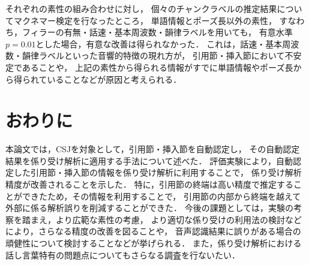 \documentclass[japanese]{jnlp_1.4}
\begin{document}
それぞれの素性の組み合わせに対し，
個々のチャンクラベルの推定結果についてマクネマー検定を行なったところ，
単語情報とポーズ長以外の素性，
すなわち，フィラーの有無・話速・基本周波数・韻律ラベルを用いても，
有意水準$p=0.01$とした場合，有意な改善は得られなかった．
これは，話速・基本周波数・韻律ラベルといった音響的特徴の現れ方が，
引用節・挿入節において不安定であることや，
上記の素性から得られる情報がすでに単語情報やポーズ長から得られていることなどが原因と考えられる．


\section{おわりに}\label{sec:final}

本論文では，CSJを対象として，引用節・挿入節を自動認定し，
その自動認定結果を係り受け解析に適用する手法について述べた．
評価実験により，自動認定した引用節・挿入節の情報を係り受け解析に利用することで，
係り受け解析精度が改善されることを示した．
特に，引用節の終端は高い精度で推定することができたため，その情報を利用することで，
引用節の内部から終端を越えて外部に係る解析誤りを削減することができた．
今後の課題としては，実験の考察を踏まえ，より広範な素性の考慮，
より適切な係り受けの利用法の検討などにより，さらなる精度の改善を図ることや，
音声認識結果に誤りがある場合の頑健性について検討することなどが挙げられる．
また，係り受け解析における話し言葉特有の問題点についてもさらなる調査を行ないたい．
\end{document}
